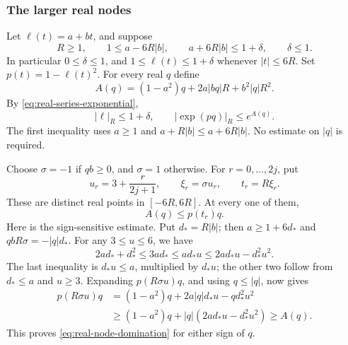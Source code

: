 \subsubsection{The larger real nodes}
Let $\ell(t)=a+bt$, and suppose
\begin{equation}\label{eq:real-affine-band}
 R\ge1,\qquad 1\le a-6R|b|,\qquad
 a+6R|b|\le1+\delta,\qquad \delta\le1.
\end{equation}
In particular $0\le\delta\le1$, and
$1\le\ell(t)\le1+\delta$ whenever $|t|\le6R$.
Set $p(t)=1-\ell(t)^2$. For every real $q$ define
\[
 A(q)=(1-a^2)q+2a|bq|R+b^2|q|R^2.
\]
By \eqref{eq:real-series-exponential},
\begin{equation}\label{eq:real-exponent-price}
             |\ell|_R\le1+\delta,\qquad
             |\exp(pq)|_R\le e^{A(q)}.
\end{equation}
The first inequality uses $a\ge1$ and
$a+R|b|\le a+6R|b|$. No estimate on $|q|$ is required.

Choose $\sigma=-1$ if $qb\ge0$, and $\sigma=1$ otherwise. For
$r=0,\ldots,2j$, put
\[
 u_r=3+\frac{r}{2j+1},\qquad \xi_r=\sigma u_r,
                   \qquad t_r=R\xi_r.
\]
These are distinct real points in $[-6R,6R]$. At every one of them,
\begin{equation}\label{eq:real-node-domination}
                             A(q)\le p(t_r)q.
\end{equation}
Here is the sign-sensitive estimate. Put $d_*=R|b|$; then
$a\ge1+6d_*$ and $qbR\sigma=-|q|d_*$. For any
$3\le u\le6$, we have
\[
 2ad_*+d_*^2\le3ad_*\le ad_*u
                              \le2ad_*u-d_*^2u^2.
\]
The last inequality is $d_*u\le a$, multiplied by $d_*u$;
the other two follow from $d_*\le a$ and $u\ge3$.
Expanding $p(R\sigma u)q$, and using $q\le|q|$, now gives
\[
\begin{split}
 p(R\sigma u)q
  &=(1-a^2)q+2a|q|d_*u-qd_*^2u^2\\
  &\ge(1-a^2)q+|q|(2ad_*u-d_*^2u^2)\ge A(q).
\end{split}
\]
This proves \eqref{eq:real-node-domination} for either sign of $q$.

